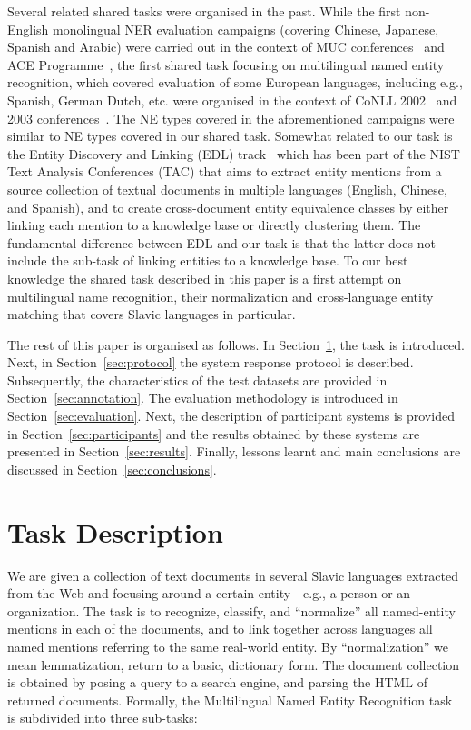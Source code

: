 \documentclass[11pt]{article}
\begin{document}
Several related shared tasks were organised in the past. While the first non-English monolingual 
NER evaluation campaigns (covering Chinese, Japanese, Spanish and Arabic) were carried out in the 
context of MUC conferences~\cite{chinchor:98} and ACE Programme~\cite{conf/lrec/DoddingtonMPRSW04},
the first shared task focusing on multilingual named entity recognition, which covered evaluation of
some European languages, including e.g., Spanish, German Dutch, etc. were organised in the context of
CoNLL 2002~\cite{TjongKimSang:2002:ICS:1118853.1118877} and 2003 conferences~\cite{TjongKimSang:2003:ICS:1119176.1119195}.
The NE types covered in the aforementioned campaigns were similar to NE types covered in our
shared task. Somewhat related to our task is the Entity Discovery and Linking (EDL) track~\cite{ji:ea:2014,ji:ea:2015} 
which has been part of the NIST Text Analysis Conferences (TAC) that aims to extract entity mentions 
from a source collection of textual documents in multiple languages (English, Chinese, and Spanish), 
and to create cross-document entity equivalence classes by either linking each mention to a knowledge base or
directly clustering them. The fundamental difference between EDL and our task
is that the latter does not include the sub-task of linking entities to a knowledge base. 
To our best knowledge the shared task described in this paper is a first attempt on multilingual
name recognition, their normalization and cross-language entity matching that covers Slavic
languages in particular.

The rest of this paper is organised as follows. In Section~\ref{sec:task}, the task is
introduced.  Next, in Section~\ref{sec:protocol} the system response
protocol is described.  Subsequently, the characteristics of the test
datasets are provided in Section~\ref{sec:annotation}.  The evaluation
methodology is introduced in Section~\ref{sec:evaluation}.  Next, the
description of participant systems is provided in
Section~\ref{sec:participants} and the results obtained by these systems
are presented in Section~\ref{sec:results}.  Finally, lessons learnt and
main conclusions are discussed in Section~\ref{sec:conclusions}.

\section{Task Description}
\label{sec:task}


We are given a collection of text documents in several Slavic languages
extracted from the Web and focusing around a certain entity---e.g., a
person or an organization.  The task is to recognize, classify, and
``normalize'' all named-entity mentions in each of the documents, and to
link together across languages all named mentions referring to the same
real-world entity.  By ``normalization'' we mean lemmatization, return to
a basic, dictionary form.  The document collection is obtained by posing
a query to a search engine, and parsing the HTML of returned documents.
Formally, the Multilingual Named Entity Recognition task is
subdivided into three sub-tasks:
\end{document}
